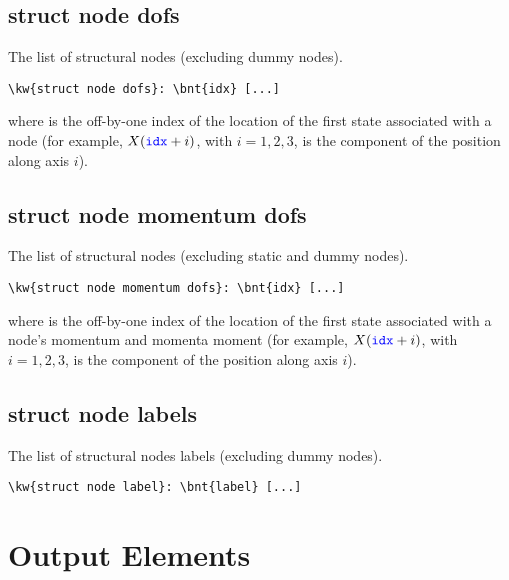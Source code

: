 \subsection{struct node dofs}
The list of structural nodes (excluding dummy nodes).
\begin{Verbatim}[commandchars=\\\{\}]
\kw{struct node dofs}: \bnt{idx} [...]
\end{Verbatim}
where  is the off-by-one index of the location of the first
state associated with a node (for example, $X(\textcolor{blue}{\texttt{idx}} + i)$, with $i = 1,2,3$,
is the component of the position along axis $i$).

\subsection{struct node momentum dofs}
The list of structural nodes (excluding static and dummy nodes).
\begin{Verbatim}[commandchars=\\\{\}]
\kw{struct node momentum dofs}: \bnt{idx} [...]
\end{Verbatim}
where  is the off-by-one index of the location of the first
state associated with a node's momentum and momenta moment
(for example, $X(\textcolor{blue}{\texttt{idx}} + i)$, with $i = 1,2,3$,
is the component of the position along axis $i$).

\subsection{struct node labels}
The list of structural nodes labels (excluding dummy nodes).
\begin{Verbatim}[commandchars=\\\{\}]
\kw{struct node label}: \bnt{label} [...]
\end{Verbatim}


\section{Output Elements}

